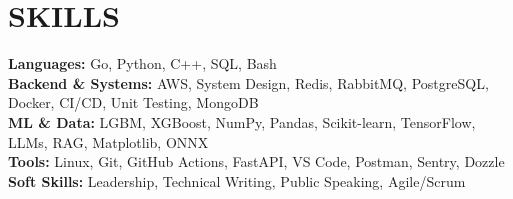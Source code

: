\documentclass[a4paper,10pt]{article}
\begin{document}
\section*{SKILLS}
\textbf{Languages:} Go, Python, C++, SQL, Bash \\
\textbf{Backend \& Systems:} AWS, System Design, Redis, RabbitMQ, PostgreSQL, Docker, CI/CD, Unit Testing, MongoDB \\
\textbf{ML \& Data:} LGBM, XGBoost, NumPy, Pandas, Scikit-learn, TensorFlow, LLMs, RAG, Matplotlib, ONNX \\
\textbf{Tools:} Linux, Git, GitHub Actions, FastAPI, VS Code, Postman, Sentry, Dozzle \\
\textbf{Soft Skills:} Leadership, Technical Writing, Public Speaking, Agile/Scrum
\end{document}
